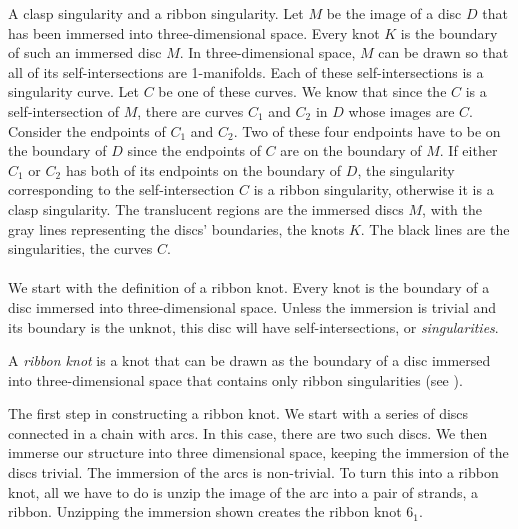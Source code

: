 \documentclass{ws-jktr}
\begin{document}
{A clasp singularity and a ribbon singularity.
Let $M$ be the image of a disc $D$ that has been immersed into three-dimensional
space.
Every knot $K$ is the boundary of such an immersed disc $M$.
In three-dimensional space, $M$ can be drawn so that all of its
self-intersections are 1-manifolds.
Each of these self-intersections is a singularity curve.
Let $C$ be one of these curves.
We know that since the $C$ is a self-intersection of $M$, there are curves $C_1$
and $C_2$ in $D$ whose images are $C$.
Consider the endpoints of $C_1$ and $C_2$.
Two of these four endpoints have to be on the boundary of $D$ since the
endpoints of $C$ are on the boundary of $M$.
If either $C_1$ or $C_2$ has both of its endpoints on the boundary of $D$, the
singularity corresponding to the self-intersection $C$ is a ribbon singularity,
otherwise it is a clasp singularity.
The translucent regions are the immersed discs $M$, with the gray lines
representing the discs' boundaries, the knots $K$.
The black lines are the singularities, the curves $C$.}\\\\

We start with the definition of a ribbon knot.
Every knot is the boundary of a disc immersed into three-dimensional space.
Unless the immersion is trivial and its boundary is the unknot, this disc will
have self-intersections, or \textit{singularities}.

\begin{definition}
A \textit{ribbon knot} is a knot that can be drawn as the boundary of a disc
immersed into three-dimensional space that contains only ribbon singularities
(see \figSingularities).
\end{definition}

{The first step in constructing a ribbon knot.
We start with a series of discs connected in a chain with arcs.
In this case, there are two such discs.
We then immerse our structure into three dimensional space, keeping the
immersion of the discs trivial.
The immersion of the arcs is non-trivial.
To turn this into a ribbon knot, all we have to do is unzip the image of the
arc into a pair of strands, a ribbon.
Unzipping the immersion shown creates the ribbon knot $6_1$.}\\\\
\end{document}
